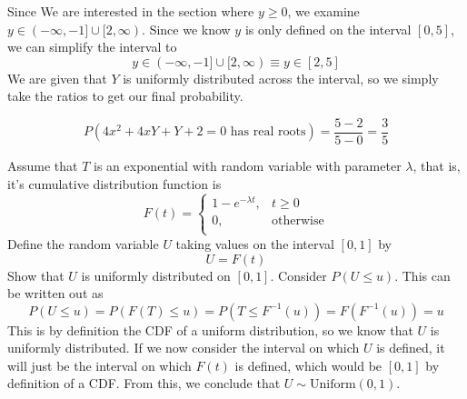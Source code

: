 \documentclass{exam}
\begin{document}
\begin{questions}
\newline
Since We are interested in the section where $y \geq 0$, we examine $y \in (-\infty, -1] \cup [2, \infty)$. Since we know $y$ is only defined on the interval $[0, 5]$, we can simplify the interval to
$$y \in (-\infty, -1] \cup [2, \infty) \equiv y \in [2, 5]$$
We are given that $Y$ is uniformly distributed across the interval, so we simply take the ratios to get our final probability.

$$P(4x^2 + 4xY + Y + 2 = 0 \text{ has real roots}) = \frac{5 - 2}{5 - 0} = \frac{3}{5}$$

\newpage
\question
Assume that $T$ is an exponential with random variable with parameter $\lambda$, that is, it's cumulative distribution function is
$$F(t) =
\begin{cases}
    1 - e^{-\lambda t}, & t \geq 0 \\
    0, & \text{otherwise} \\
\end{cases}$$
Define the random variable $U$ taking values on the interval $[0, 1]$ by
$$U = F(t)$$
Show that $U$ is uniformly distributed on $[0, 1]$.
\sol
Consider $P(U \leq u)$. This can be written out as
$$P(U \leq u) = P(F(T) \leq u) = P(T \leq F^{-1}(u)) = F(F^{-1}(u)) = u$$
This is by definition the CDF of a uniform distribution, so we know that $U$ is uniformly distributed. If we now consider the interval on which $U$ is defined, it will just be the interval on which $F(t)$ is defined, which would be $[0, 1]$ by definition of a CDF. From this, we conclude that $U \sim \text{Uniform}(0, 1)$.
\end{questions}
\end{document}
